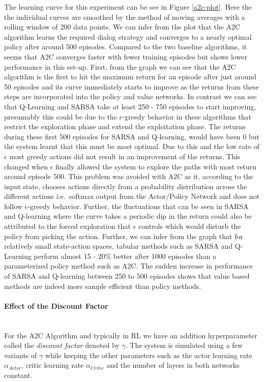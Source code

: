 \documentclass[12pt]{extarticle}
\newcommand{\myparagraph}[1]{\paragraph{#1}\mbox{}\\ \linebreak}
\numberwithin{equation}{section}
\begin{document}
	The learning curve for this experiment can be see in Figure \ref{a2c-plot}. Here the the individual curves are smoothed by the method of moving averages with a rolling window of 200 data points. We can infer from the plot that the A2C algorithm learns the required dialog strategy and converges to a nearly optimal policy after around 500 episodes. Compared to the two baseline algorithms, it seems that A2C converges faster with fewer training episodes but shows lower performance in this set-up.
	First, from the graph we can see that the A2C algorithm is the first to hit the maximum return for an episode after just around 50 episodes and its curve immediately starts to improve as the returns from these steps are incorporated into the policy and value networks. In contrast we can see that Q-Learning and SARSA take at least 250 - 750 episodes to start improving, presumably this could be due to the $\epsilon$-greedy behavior in these algorithms that restrict the exploration phase and extend the exploitation phase. The returns during these first 500 episodes for SARSA and Q-learning, would have been 0 but the system learnt that this must be most optimal. Due to this and the low rate of $\epsilon$ most greedy actions did not result in an improvement of the returns. This changed when $\epsilon$ finally allowed the system to explore the paths with most return around episode 500. This problem was avoided with A2C as it, according to the input state, chooses actions directly from a probability distribution across the different actions i.e.\ softmax output from the Actor/Policy Network and does not follow $\epsilon$-greedy behavior. Further, the fluctuations that can be seen in SARSA and Q-learning where the curve takes a periodic dip in the return could also be attributed to the forced exploration that $\epsilon$ controls which would disturb the policy from picking the action. Further, we can infer from the graph that for relatively small state-action spaces, tabular methods such as SARSA and Q-Learning perform almost 15 - 20\% better after 1000 episodes than a parameterized policy method such as A2C. The sudden increase in performance of SARSA and Q-learning between 250 to 500 episodes shows that value based methods are indeed more sample efficient than policy methods.
	\myparagraph{Effect of the Discount Factor}\label{a2c_df_effect}
	For the A2C Algorithm and typically in RL we have an addition hyperparameter called the \textit{discount factor} denoted by $\gamma$. The system is simulated using a few variants of $\gamma$ while keeping the other parameters such as the actor learning rate $\alpha_{Actor}$, critic learning rate $\alpha_{Critic}$ and the number of layers in both networks constant. 
\end{document}
